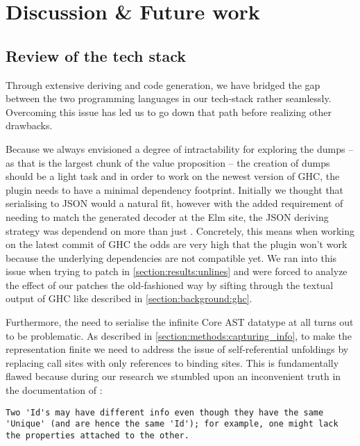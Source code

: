 \chapter{Discussion \& Future work}

\section{Review of the tech stack}
\label{section:discussion:review}

Through extensive deriving and code generation, we have bridged the gap between the two programming languages in our tech-stack
rather seamlessly. Overcoming this issue has led us to go down that path before realizing other drawbacks.

Because we always envisioned a degree of intractability for exploring the dumps -- as that is the largest chunk of the value proposition --
the creation of dumps should be a light task and in order to work on the newest version of GHC, the plugin needs to have
a minimal dependency footprint. Initially we thought that serialising to JSON would a natural fit, however with the added requirement
of needing to match the generated decoder at the Elm site, the JSON deriving strategy was dependend on more than just .
Concretely, this means when working on the latest commit of GHC the odds are very high that the plugin won't work because the underlying
dependencies are not compatible yet. We ran into this issue when trying to patch  in \cref{section:results:unlines} and were
forced to analyze the effect of our patches the old-fashioned way by sifting through the textual output of GHC like described in \cref{section:background:ghc}.

Furthermore, the need to serialise the infinite Core AST datatype at all turns out to be problematic. 
As described in \cref{section:methods:capturing_info}, to make the representation finite we need to address the
issue of self-referential unfoldings by replacing call sites with only references to binding sites. This is fundamentally
flawed because during our research we stumbled upon an inconvenient truth in the documentation of :

\begin{listing}[H]
\begin{verbatim}
Two 'Id's may have different info even though they have the same
'Unique' (and are hence the same 'Id'); for example, one might lack
the properties attached to the other.
\end{verbatim}
\end{listing}

